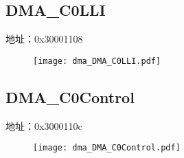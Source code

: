 \subsection{DMA\_C0LLI}
\label{dma-DMA-C0LLI}
地址：0x30001108
 \begin{figure}[H]
\texttt{[image: dma\_DMA\_C0LLI.pdf]}
\end{figure}

\subsection{DMA\_C0Control}
\label{dma-DMA-C0Control}
地址：0x3000110c
 \begin{figure}[H]
\texttt{[image: dma\_DMA\_C0Control.pdf]}
\end{figure}

